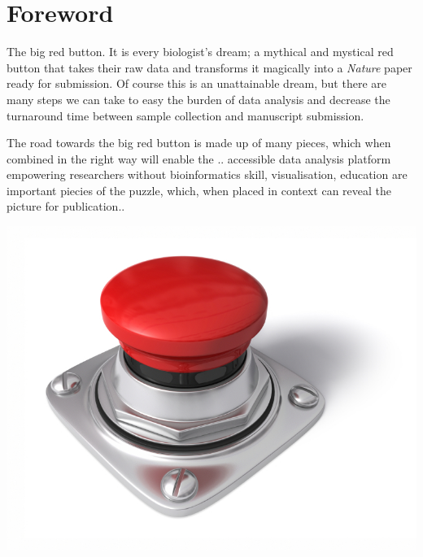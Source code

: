 \chapter*{Foreword}
{}
\setlength\parindent{0pt}
\vspace{-1cm}
The big red button. It is every biologist's dream; a mythical and mystical red button that takes their raw data and transforms it magically into a \emph{Nature} paper ready for submission. Of course this is an unattainable dream, but there are many steps we can take to easy the burden of data analysis and decrease the
turnaround time between sample collection and manuscript submission.

The road towards the big red button is made up of many pieces, which when combined in the right way will enable the  .. accessible data analysis platform empowering researchers without bioinformatics skill, visualisation, education are important piecies of the puzzle, which, when placed in context can reveal  the picture for publication..

\begin{center}
\includegraphics[scale=0.25]{chapters/images/redbutton.jpg}
\end{center}
